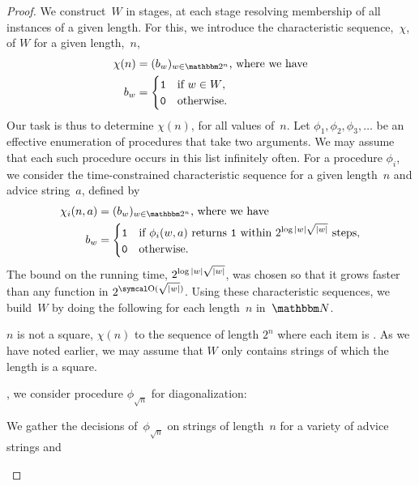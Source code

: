 \begin{proof}
  We construct~$W$ in stages, at each stage resolving membership of all instances of a given length.
  For this, we introduce the characteristic sequence,~$\chi$, of $W$ for a given length,~$n$,
  \begin{align*}
    \chi(n) &\deq (b_w)_{w \in \binary^n}\text{, where we have} \\
    b_w &= \begin{cases}
      \bits{1}	&\text{if $w \in W$}, \\
      \bits{0}	&\text{otherwise}.
    \end{cases}
  \end{align*}
  Our task is thus to determine $\chi(n)$, for all values of~$n$.
  Let $\phi_1, \phi_2, \phi_3, \ldots$ be an effective enumeration of procedures that take two arguments.
  We may assume that each such procedure occurs in this list infinitely often.
  For a procedure $\phi_i$, we consider the time-constrained characteristic sequence for a given length~$n$ and advice string~$a$, defined by
  \begin{align*}
    \chi_i(n, a) &\deq (b_w)_{w \in \binary^n}\text{, where we have} \\
    b_w &= \begin{cases}
      \bits{1}	&\text{if $\phi_i(w, a)$ returns \bits{1} within $2^{\log\length{w} \sqrt{\length{w}}}$ steps}, \\
      \bits{0}	&\text{otherwise}.
    \end{cases}
  \end{align*}
  The bound on the running time, $2^{\log{\lvert w\rvert} \sqrt{{\lvert w\rvert}}}$, was chosen so that it grows faster than any function in $2^{\bigO(\sqrt{\length{w}})}$.
  Using these characteristic sequences, we build~$W$ by doing the following for each length~$n$ in~$\bbN$.
  \begin{codelisting}
  \item
     $n$ is not a square,  $\chi(n)$ to the sequence of length $2^n$ where each item is .
    As we have noted earlier, we may assume that $W$ only contains strings of which the length is a square.
  \item
    , we consider procedure $\phi_{\sqrt{n}}$ for diagonalization:
    \begin{codelisting}
    \item
      We gather the decisions of~$\phi_{\sqrt{n}}$ on strings of length~$n$ for a variety of advice strings and 
      \begin{equation*}

\end{equation*}
\end{codelisting}
\end{codelisting}
\end{proof}
